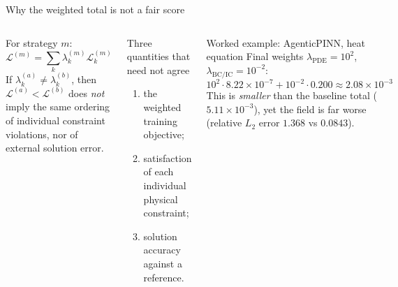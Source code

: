 \documentclass[aspectratio=169,10pt]{beamer}
\begin{document}
\begin{frame}{Why the weighted total is not a fair score}
\begin{columns}[T,onlytextwidth]
For strategy $m$:
\[
\mathcal{L}^{(m)}=\sum_k\lambda_k^{(m)}\mathcal{L}_k^{(m)}
\]
If $\lambda_k^{(a)}\ne\lambda_k^{(b)}$, then $\mathcal{L}^{(a)}<\mathcal{L}^{(b)}$ does \emph{not} imply the same ordering of individual constraint violations, nor of external solution error.
\vspace{2pt}
\begin{block}{Three quantities that need not agree}
\small
\begin{enumerate}
  \item the weighted training objective;
  \item satisfaction of each individual physical constraint;
  \item solution accuracy against a reference.
\end{enumerate}
\end{block}
\begin{alertblock}{Worked example: AgenticPINN, heat equation}
\small
Final weights $\lambda_{\mathrm{PDE}}=10^{2}$, $\lambda_{\mathrm{BC/IC}}=10^{-2}$:
\[
10^{2}\!\cdot\!8.22\!\times\!10^{-7}+10^{-2}\!\cdot\!0.200\approx2.08\!\times\!10^{-3}
\]
This is \emph{smaller} than the baseline total ($5.11\times10^{-3}$), yet the field is far worse (relative $L_2$ error $1.368$ vs $0.0843$).
\end{alertblock}
\end{columns}
\end{frame}
\end{document}
